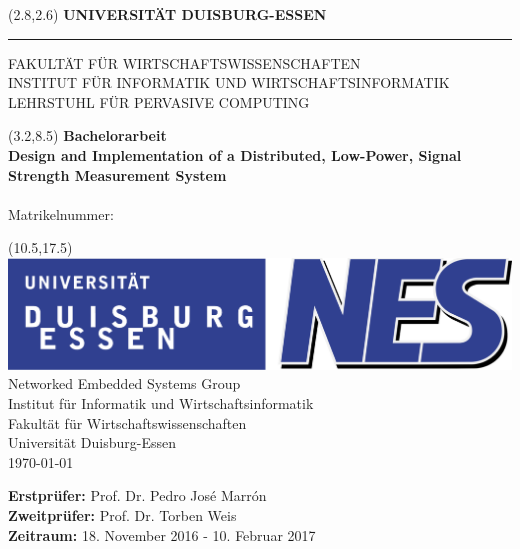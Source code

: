 \begin{titlepage}
\vspace*{-1cm}
\newlength{\links}
\setlength{\links}{0.9cm}
\setlength{\TPHorizModule}{1cm}
\setlength{\TPVertModule}{1cm}
\textblockorigin{0pt}{0pt}

\sf
\LARGE

\begin{textblock}{16.5}(2.8,2.6)
 \hspace*{-0.25cm} \textbf{UNIVERSITÄT DUISBURG-ESSEN} \\
 \hspace*{-1.15cm} \rule{5mm}{5mm} \hspace*{0.05cm} FAKULTÄT FÜR WIRTSCHAFTSWISSENSCHAFTEN\\
 \large{}INSTITUT FÜR INFORMATIK UND WIRTSCHAFTSINFORMATIK \\
 \large{}LEHRSTUHL FÜR PERVASIVE COMPUTING\\
\end{textblock}


\begin{textblock}{14.5}(3.2,8.5)
  \large
{ \bf Bachelorarbeit} \\[1cm]
{\LARGE \Large\bf Design and Implementation of a Distributed, Low-Power, Signal Strength Measurement System} \\[1.3cm]
\studentFirsName { } \studentSecondName\\
Matrikelnummer: \studentMatrikelnummer
\end{textblock}



\begin{textblock}{10}(10.5,17.5)
\includegraphics[scale=0.23	]{content/images/NES_Logo.pdf}\\
\normalsize
\raggedleft
Networked Embedded Systems Group \\
Institut für Informatik und Wirtschaftsinformatik \\
Fakultät für Wirtschaftswissenschaften \\
Universität Duisburg-Essen \\[2ex]

\today\\[15ex]
\raggedright
{\bf Erstprüfer:} Prof. Dr. Pedro José Marrón \\
{\bf Zweitprüfer:} Prof. Dr. Torben Weis \\
{\bf Zeitraum:} 18. November 2016 - 10. Februar 2017\\
\end{textblock}


\end{titlepage}
